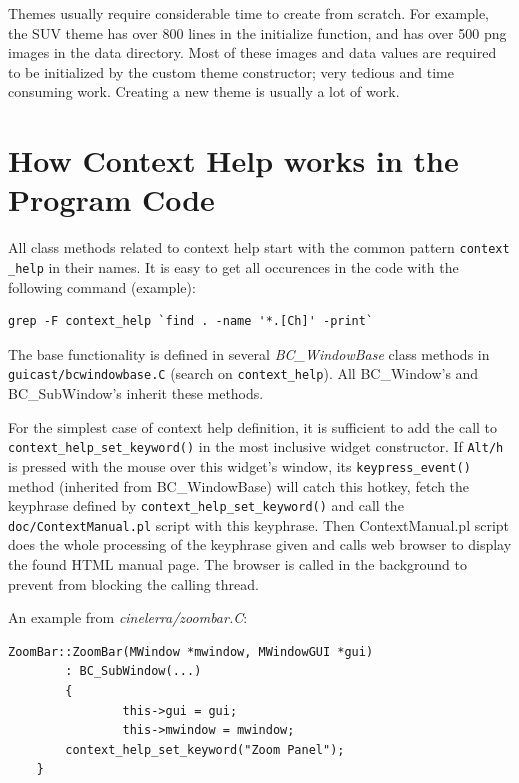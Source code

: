 Themes usually require considerable time to create from scratch.  For
example, the SUV theme has over 800 lines in the initialize function, and has over
500 png images in the data directory.  Most of these images and data values are
required to be initialized by the custom theme constructor; very tedious and
time consuming work.  Creating a new theme is usually a lot of work.

\section{How Context Help works in the Program Code}
\label{sec:context_help_coding}

All class methods related to context help start with the common pattern \texttt{context \_help} in their names. It is easy to get all occurences in the code with the following command (example):

\begin{lstlisting}[style=sh]
        grep -F context_help `find . -name '*.[Ch]' -print`
\end{lstlisting}

The base functionality is defined in several \textit{BC\_WindowBase} class methods in \\ \texttt{guicast/bcwindowbase.C} (search on \texttt{context\_help}). All BC\_Window's and BC\_SubWindow's inherit these methods.

For the simplest case of context help definition, it is sufficient to add the call to \texttt{context\_help\_set\_keyword()} in the most inclusive widget constructor. If \texttt{Alt/h} is pressed with the mouse over this widget's window, its \texttt{keypress\_event()} method (inherited from BC\_WindowBase) will catch this hotkey, fetch the keyphrase defined by \texttt{context\_help\_set\_keyword()} and call the \texttt{doc/ContextManual.pl} script with this keyphrase. Then ContextManual.pl script does the whole processing of the keyphrase given and calls web browser to display the found HTML manual page. The browser is called in the background to prevent from blocking the calling \CGG{} thread.

An example from \textit{cinelerra/zoombar.C}:

\begin{lstlisting}[style=sh]
        ZoomBar::ZoomBar(MWindow *mwindow, MWindowGUI *gui)
        : BC_SubWindow(...)
        {
                this->gui = gui;
                this->mwindow = mwindow;
		context_help_set_keyword("Zoom Panel");
	}                                                        
\end{lstlisting}

